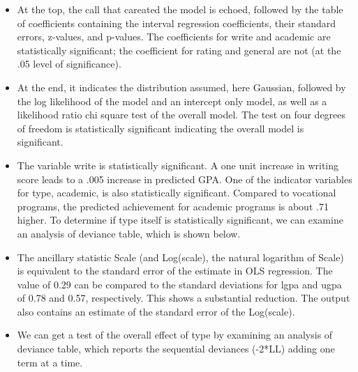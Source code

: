 \documentclass[a4paper,12pt]{article}
\begin{document}
\begin{itemize}
	\item At the top, the call that careated the model is echoed, followed by the table of coefficients containing the interval regression coefficients, their standard errors, z-values, and p-values. The coefficients for write and academic are statistically significant; the coefficient for rating and general are not (at the .05 level of significance).
\item 	At the end, it indicates the distribution assumed, here Gaussian, followed by the log likelihood of the model and an intercept only model, as well as a likelihood ratio chi square test of the overall model. The test on four degrees of freedom is statistically significant indicating the overall model is significant.
	\item The variable write is statistically significant. A one unit increase in writing score leads to a .005 increase in predicted GPA. One of the indicator variables for type, academic, is also statistically significant. Compared to vocational programs, the predicted achievement for academic programs is about .71 higher. To determine if type itself is statistically significant, we can examine an analysis of deviance table, which is shown below.
\item 	The ancillary statistic Scale (and Log(scale), the natural logarithm of Scale) is equivalent to the standard error of the estimate in OLS regression. The value of 0.29 can be compared to the standard deviations for lgpa and ugpa of 0.78 and 0.57, respectively. This shows a substantial reduction. The output also contains an estimate of the standard error of the Log(scale).
\item	We can get a test of the overall effect of type by examining an analysis of deviance table, which reports the sequential deviances (-2*LL) adding one term at a time.
\end{itemize}
\end{document}
